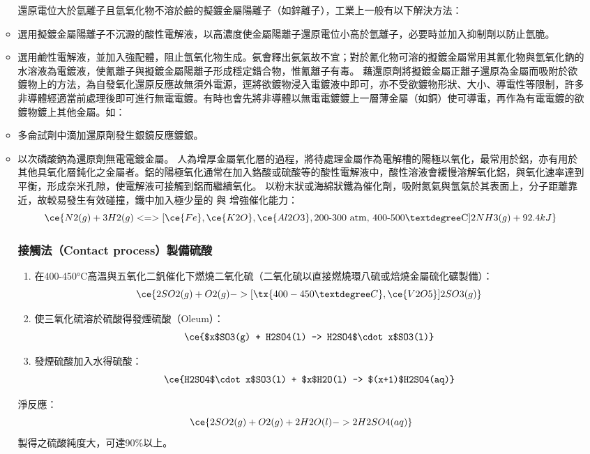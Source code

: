 \documentclass[a4paper,12pt]{report}
\begin{document}
\begin{itemize}
\begin{itemize}
還原電位大於氫離子且氫氧化物不溶於鹼的擬鍍金屬陽離子（如鋅離子），工業上一般有以下解決方法：
\bit
\item 選用擬鍍金屬陽離子不沉澱的酸性電解液，以高濃度使金屬陽離子還原電位小高於氫離子，必要時並加入抑制劑以防止氫脆。
\item 選用鹼性電解液，並加入強配體，阻止氫氧化物生成。氨會釋出氨氣故不宜；對於氰化物可溶的擬鍍金屬常用其氰化物與氫氧化鈉的水溶液為電鍍液，使氰離子與擬鍍金屬陽離子形成穩定錯合物，惟氰離子有毒。
\eit
{}
藉還原劑將擬鍍金屬正離子還原為金屬而吸附於欲鍍物上的方法，為自發氧化還原反應故無須外電源，逕將欲鍍物浸入電鍍液中即可，亦不受欲鍍物形狀、大小、導電性等限制，許多非導體經適當前處理後即可進行無電電鍍。有時也會先將非導體以無電電鍍鍍上一層薄金屬（如銅）使可導電，再作為有電電鍍的欲鍍物鍍上其他金屬。如：
\bit
\item 多侖試劑中滴加還原劑發生銀鏡反應鍍銀。
\item 以次磷酸鈉為還原劑無電電鍍金屬。
\eit
{}
人為增厚金屬氧化層的過程，將待處理金屬作為電解槽的陽極以氧化，最常用於鋁，亦有用於其他具氧化層鈍化之金屬者。鋁的陽極氧化通常在加入鉻酸或硫酸等的酸性電解液中，酸性溶液會緩慢溶解氧化鋁，與氧化速率達到平衡，形成奈米孔隙，使電解液可接觸到鋁而繼續氧化。
以粉末狀或海綿狀鐵為催化劑，吸附氮氣與氫氣於其表面上，分子距離靠近，故較易發生有效碰撞，鐵中加入極少量的 與 增強催化能力：
\[\ce{N2(g) + 3H2(g) <=>[\ce{Fe}, \ce{K2O}, \ce{Al2O3}, \text{200-300 atm, 400-500°C}] 2NH3(g) + 92.4kJ}\]
\subsubsection{接觸法（Contact process）製備硫酸}
\begin{enumerate}
\item 在400-450°C高溫與五氧化二釩催化下燃燒二氧化硫（二氧化硫以直接燃燒環八硫或焙燒金屬硫化礦製備）：
\[\ce{2SO2(g) + O2(g) ->[\tx{400-450°C}, \ce{V2O5}] 2SO3(g)}\]
\item 使三氧化硫溶於硫酸得發煙硫酸（Oleum）：
\[\ce{$x$SO3(g) + H2SO4(l) -> H2SO4$\cdot x$SO3(l)}\]
\item 發煙硫酸加入水得硫酸：
\[\ce{H2SO4$\cdot x$SO3(l) + $x$H2O(l) -> $(x+1)$H2SO4(aq)}\]
\end{enumerate}
淨反應：
\[\ce{2SO2(g) + O2(g) + 2H2O(l) -> 2H2SO4(aq)}\]
製得之硫酸純度大，可達90\%以上。

\end{itemize}
\end{itemize}
\end{document}
